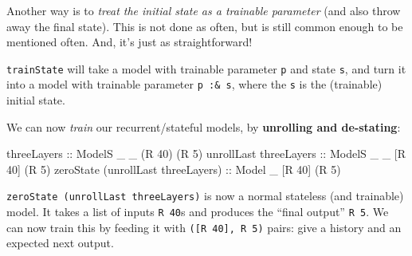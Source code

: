 \documentclass[]{article}
\newenvironment{Shaded}{}{}
\newcommand{\CommentTok}[1]{\textcolor[rgb]{0.38,0.63,0.69}{\textit{#1}}}
\newcommand{\DataTypeTok}[1]{\textcolor[rgb]{0.56,0.13,0.00}{#1}}
\newcommand{\DecValTok}[1]{\textcolor[rgb]{0.25,0.63,0.44}{#1}}
\newcommand{\FunctionTok}[1]{\textcolor[rgb]{0.02,0.16,0.49}{#1}}
\newcommand{\KeywordTok}[1]{\textcolor[rgb]{0.00,0.44,0.13}{\textbf{#1}}}
\newcommand{\NormalTok}[1]{#1}
\newcommand{\OtherTok}[1]{\textcolor[rgb]{0.00,0.44,0.13}{#1}}
\begin{document}
Another way is to \emph{treat the initial state as a trainable parameter} (and
also throw away the final state). This is not done as often, but is still common
enough to be mentioned often. And, it's just as straightforward!

\begin{Shaded}
\end{Shaded}

\texttt{trainState} will take a model with trainable parameter \texttt{p} and
state \texttt{s}, and turn it into a model with trainable parameter
\texttt{p\ :\&\ s}, where the \texttt{s} is the (trainable) initial state.

We can now \emph{train} our recurrent/stateful models, by \textbf{unrolling and
de-stating}:

\begin{Shaded}
\begin{Highlighting}[]
\OtherTok{threeLayers                        ::} \DataTypeTok{ModelS}\NormalTok{ _ _ (}\DataTypeTok{R} \DecValTok{40}\NormalTok{) (}\DataTypeTok{R} \DecValTok{5}\NormalTok{)}
\NormalTok{unrollLast}\OtherTok{ threeLayers             ::} \DataTypeTok{ModelS}\NormalTok{ _ _ [}\DataTypeTok{R} \DecValTok{40}\NormalTok{] (}\DataTypeTok{R} \DecValTok{5}\NormalTok{)}
\NormalTok{zeroState (unrollLast threeLayers)}\OtherTok{ ::} \DataTypeTok{Model}\NormalTok{  _   [}\DataTypeTok{R} \DecValTok{40}\NormalTok{] (}\DataTypeTok{R} \DecValTok{5}\NormalTok{)}
\end{Highlighting}
\end{Shaded}

\texttt{zeroState\ (unrollLast\ threeLayers)} is now a normal stateless (and
trainable) model. It takes a list of inputs \texttt{R\ 40}s and produces the
``final output'' \texttt{R\ 5}. We can now train this by feeding it with
\texttt{({[}R\ 40{]},\ R\ 5)} pairs: give a history and an expected next output.
\end{document}
